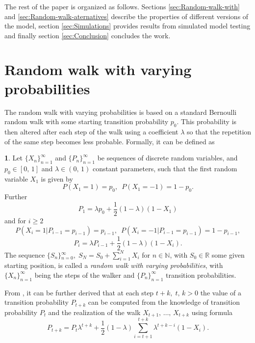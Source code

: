 \documentclass{amsart}
\theoremstyle{definition}
\newtheorem{defn}{\protect\definitionname}
\theoremstyle{plain}
\theoremstyle{plain}
\numberwithin{equation}{section}
\providecommand{\definitionname}{Definition}
\begin{document}
The rest of the paper is organized as follows. Sections \ref{sec:Random-walk-with}
and \ref{sec:Random-walk-aternatives} describe the properties of
different versions of the model, section \ref{sec:Simulations} provides
results from simulated model testing and finally section \ref{sec:Conclusion}
concludes the work.

\section{Random walk with varying probabilities\label{sec:Random-walk-with}}

The random walk with varying probabilities is based on a standard
Bernoulli random walk \cite{feller1957introduction} with some starting
transition probability $p_{0}$. This probability is then altered
after each step of the walk using a coefficient $\lambda$ so that
the repetition of the same step becomes less probable. Formally, it
can be defined as
\begin{defn}
\label{success_punished}Let ${\{X_{n}\}}_{n=1}^{\infty}$ and ${\{P_{n}\}}_{n=1}^{\infty}$
be sequences of discrete random variables, and $p_{0}\in[0,\,1]$
and $\lambda\in(0,\,1)$ constant parameters, such that the first
random variable $X_{1}$ is given by
\[
P(X_{1}=1)=p_{0},\,\,\,
P(X_{1}=-1)=1-p_{0}.
\]
Further 
\begin{equation}
P_{1}=\lambda p_{0}+\frac{1}{2}(1-\lambda)(1-X_{1})\label{eq:P!1_def}
\end{equation}
and for $i\geq2$
\[
P(X_{i}=1|P_{i-1}=p_{i-1})=p_{i-1},\,\,\,
P(X_{i}=-1|P_{i-1}=p_{i-1})=1-p_{i-1},
\]
\begin{equation}
P_{i}=\lambda P_{i-1}+\frac{1}{2}(1-\lambda)(1-X_{i}).\label{eq:Pi_def}
\end{equation}
The sequence ${\{S_{n}\}}{}_{n=0}^{\infty},\;S_{N}=S_{0}+\sum_{i=1}^{N}X_{i}$
for $n\in\mathbb{N}$, with $S_{0}\in\mathbb{R}$ some given starting
position, is called a \emph{random walk with varying probabilities},
with ${\{X_{n}\}}_{n=1}^{\infty}$ being the steps of the walker and
${\{P_{n}\}}_{n=1}^{\infty}$ transition probabilities.

\smallskip
From \cite{ja2019teze}, it can be further derived that at each step
$t+k,\;t,\,k>0$ the value of a transition probability $P_{t+k}$
can be computed from the knowledge of transition probability $P_{t}$
and the realization of the walk $X_{t+1},\,\dots,\,X_{t+k}$ using
formula 
\[
P_{t+k}=P_{t}\lambda^{t+k}+\frac{1}{2}(1-\lambda)\sum_{i=t+1}^{t+k}\lambda^{t+k-i}(1-X_{i}).
\]
\end{defn}
\end{document}

